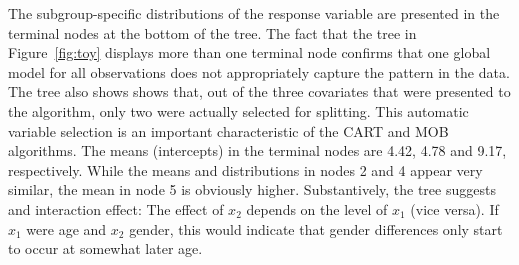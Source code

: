 \documentclass[doc,floatsintext,natbib]{apa7}
\begin{document}
The subgroup-specific distributions of the response variable are presented in the terminal nodes at the bottom of the tree. The fact that the tree in Figure~\ref{fig:toy} displays more than one terminal node confirms that one global model for all observations does not appropriately capture the pattern in the data.  The tree also shows shows that, out of the three covariates that were presented to the algorithm, only two were actually selected for splitting. This automatic variable selection is an important characteristic of the CART and MOB algorithms. The means (intercepts) in the terminal nodes are 4.42, 4.78 and 9.17, respectively. While the means and distributions in nodes 2 and 4 appear very similar, the mean in node 5 is obviously higher. Substantively, the tree suggests and interaction effect: The effect of $x_2$ depends on the level of $x_1$ (vice versa). If $x_1$ were age and $x_2$ gender, this would indicate that gender differences only start to occur at somewhat later age.   




\end{document}
